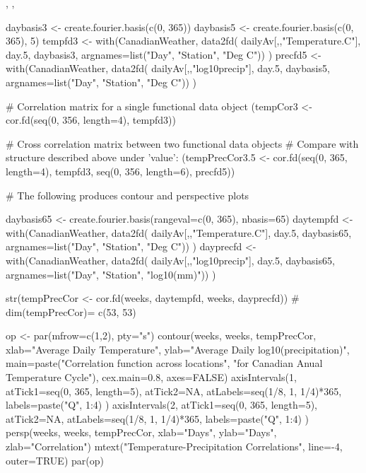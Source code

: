\begin{SeeAlso}\relax
{}, 
, 
\end{SeeAlso}
\begin{Examples}
\begin{ExampleCode}
daybasis3 <- create.fourier.basis(c(0, 365))
daybasis5 <- create.fourier.basis(c(0, 365), 5)
tempfd3 <- with(CanadianWeather, data2fd(
       dailyAv[,,"Temperature.C"], day.5,
       daybasis3, argnames=list("Day", "Station", "Deg C")) )
precfd5 <- with(CanadianWeather, data2fd(
       dailyAv[,,"log10precip"], day.5,
       daybasis5, argnames=list("Day", "Station", "Deg C")) )

# Correlation matrix for a single functional data object
(tempCor3 <- cor.fd(seq(0, 356, length=4), tempfd3))

# Cross correlation matrix between two functional data objects 
# Compare with structure described above under 'value':
(tempPrecCor3.5 <- cor.fd(seq(0, 365, length=4), tempfd3,
                          seq(0, 356, length=6), precfd5))

# The following produces contour and perspective plots

daybasis65 <- create.fourier.basis(rangeval=c(0, 365), nbasis=65)
daytempfd <- with(CanadianWeather, data2fd(
       dailyAv[,,"Temperature.C"], day.5,
       daybasis65, argnames=list("Day", "Station", "Deg C")) )
dayprecfd <- with(CanadianWeather, data2fd(
       dailyAv[,,"log10precip"], day.5,
       daybasis65, argnames=list("Day", "Station", "log10(mm)")) )

str(tempPrecCor <- cor.fd(weeks, daytempfd, weeks, dayprecfd))
# dim(tempPrecCor)= c(53, 53)

op <- par(mfrow=c(1,2), pty="s")
contour(weeks, weeks, tempPrecCor, 
        xlab="Average Daily Temperature",
        ylab="Average Daily log10(precipitation)",
        main=paste("Correlation function across locations\n",
          "for Canadian Anual Temperature Cycle"),
        cex.main=0.8, axes=FALSE)
axisIntervals(1, atTick1=seq(0, 365, length=5), atTick2=NA, 
            atLabels=seq(1/8, 1, 1/4)*365,
            labels=paste("Q", 1:4) )
axisIntervals(2, atTick1=seq(0, 365, length=5), atTick2=NA, 
            atLabels=seq(1/8, 1, 1/4)*365,
            labels=paste("Q", 1:4) )
persp(weeks, weeks, tempPrecCor,
      xlab="Days", ylab="Days", zlab="Correlation")
mtext("Temperature-Precipitation Correlations", line=-4, outer=TRUE)
par(op)


\end{ExampleCode}
\end{Examples}
